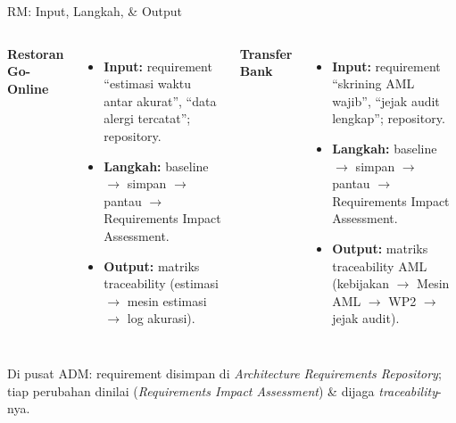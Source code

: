 \documentclass[aspectratio=169, table]{beamer}
\newcommand{\takeaway}[1]{%
  \vspace{4pt}
  {\footnotesize #1}
}
\begin{document}
\begin{frame}{RM: Input, Langkah, \& Output}
  \vspace{2pt}
  \small
  \begin{columns}[t]
    \textbf{\textcolor{praditagreen}{Restoran Go-Online}}
    \begin{itemize}\setlength{\itemsep}{2pt}
      \item \textbf{Input:} requirement ``estimasi waktu antar akurat'', ``data
            alergi tercatat''; repository.
      \item \textbf{Langkah:} baseline $\rightarrow$ simpan $\rightarrow$ pantau
            $\rightarrow$ Requirements Impact Assessment.
      \item \textbf{Output:} matriks traceability (estimasi $\rightarrow$ mesin
            estimasi $\rightarrow$ log akurasi).
    \end{itemize}
    \textbf{\textcolor{blueColor}{Transfer Bank}}
    \begin{itemize}\setlength{\itemsep}{2pt}
      \item \textbf{Input:} requirement ``skrining AML wajib'', ``jejak audit
            lengkap''; repository.
      \item \textbf{Langkah:} baseline $\rightarrow$ simpan $\rightarrow$ pantau
            $\rightarrow$ Requirements Impact Assessment.
      \item \textbf{Output:} matriks traceability AML (kebijakan $\rightarrow$
            Mesin AML $\rightarrow$ WP2 $\rightarrow$ jejak audit).
    \end{itemize}
  \end{columns}
  \takeaway{Di pusat ADM: requirement disimpan di \emph{Architecture Requirements
  Repository}; tiap perubahan dinilai (\emph{Requirements Impact Assessment}) \&
  dijaga \emph{traceability}-nya.}
\end{frame}
\end{document}
